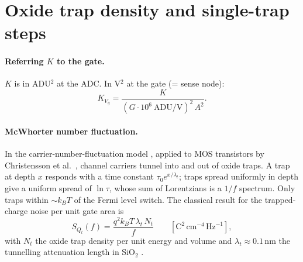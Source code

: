 \documentclass[10pt,a4paper]{article}
\begin{document}
\section{Oxide trap density and single-trap steps}\label{sec:Nt}

\paragraph{Referring $K$ to the gate.} $K$ is in ADU$^2$ at the ADC. In V$^2$ at the gate (= sense node):
\begin{equation}
K_{V_g}=\frac{K}{(G\cdot10^6\ \text{ADU/V})^2\,A^2}.
\end{equation}

\paragraph{McWhorter number fluctuation.} In the carrier-number-fluctuation model \cite{mcwhorter1957}, applied to
MOS transistors by Christensson et al.\ \cite{christensson1968}, channel carriers tunnel into and out of oxide traps.
A trap at depth $x$ responds with a time constant $\tau_0e^{x/\lambda_t}$; traps spread uniformly in depth give a
uniform spread of $\ln\tau$, whose sum of Lorentzians is a $1/f$ spectrum. Only traps within $\sim k_BT$ of the Fermi
level switch. The classical result for the trapped-charge noise per unit gate area is \cite{ghibaudo2022}
\begin{equation}
S_{Q_t}(f)=\frac{q^2k_BT\,\lambda_t\,N_t}{f}\qquad[\text{C}^2\,\text{cm}^{-4}\,\text{Hz}^{-1}],\label{eq:SQt}
\end{equation}
with $N_t$ the oxide trap density per unit energy and volume and $\lambda_t\approx0.1$\,nm the tunnelling attenuation
length in SiO$_2$ \cite{ghibaudo2022}.
\end{document}
